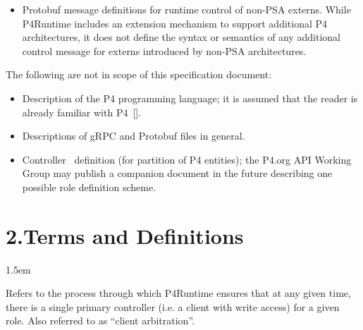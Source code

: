 \documentclass[11pt]{article}
\begin{document}
{\begin{itemize}[noitemsep,topsep=\mdcompacttopsep]
\item{}Protobuf message definitions for runtime control of non-PSA externs. While
P4Runtime includes an extension mechanism to support additional P4
architectures, it does not define the syntax or semantics of any additional
control message for externs introduced by non-PSA architectures.%
\end{itemize}%

\noindent{}The following are not in scope of this specification document:%

\begin{itemize}[noitemsep,topsep=\mdcompacttopsep]%

\item{}Description of the P4 programming language; it is assumed that the reader is
already familiar with P4~[].%

\item{}Descriptions of gRPC and Protobuf files in general.%

\item{}Controller~ definition (for partition of
P4 entities); the P4.org API Working Group may publish a companion document in
the future describing one possible role definition scheme.%
\end{itemize}%

\section{2.\hspace*{0.5em}Terms and Definitions}\label{sec-terms-and-definitions}%

\begin{mddefinitions}%


\begin{mdbmarginx}{}{}{}{1.5em}%
\begin{mddefdata}%
Refers to the process through which P4Runtime ensures that at any given
time, there is a single primary controller (i.e. a client with write access)
for a given role. Also referred to as \textquotedblleft{}client arbitration\textquotedblright{}.
\end{mddefdata}%
\end{mdbmarginx}%


\end{mddefinitions}}
\end{document}

